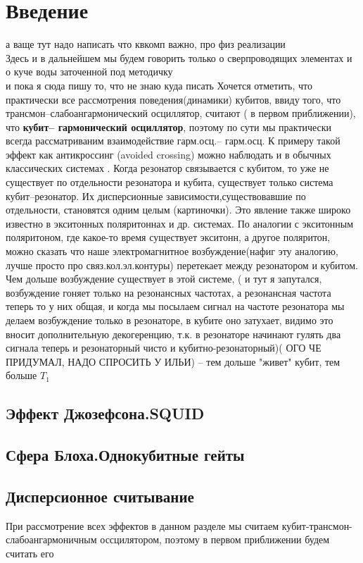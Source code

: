 \documentclass[12pt, twoside]{report}
\begin{document}
\tableofcontents
	\newpage

\chapter{Введение}
а ваще тут надо написать что квкомп важно, про физ реализации\\
 Здесь и в дальнейшем мы будем говорить только о сверпроводящих элементах и о куче воды заточенной под методичку\\ и пока я сюда пишу то, что не знаю куда писать
 Хочется отметить, что практически все рассмотрения поведения(динамики) кубитов, ввиду того, что трансмон--слабоангармонический осциллятор, считают ( в первом приближении), что \textbf{кубит-- гармонический осциллятор}, поэтому по сути мы практически всегда рассматриваним взаимодействие гарм.осц.-- гарм.осц. К примеру такой эффект как антикроссинг (avoided crossing) можно наблюдать и в обычных классических системах \cite{Novotny2010}. Когда резонатор связывается с кубитом, то уже не существует по отдельности резонатора и кубита, существует только система кубит--резонатор. Их дисперсионные зависимости,существовавшие по отдельности, становятся одним целым (картиночки). Это явление также широко известно в экситонных поляритоннах и др. системах. По аналогии с экситонным поляритоном, где какое-то время существует экситонн, а другое поляритон, можно сказать что наше электромагнитное возбуждение(нафиг эту аналогию, лучше просто про связ.кол.эл.контуры) перетекает между резонатором и кубитом. Чем дольше возбуждение существует в этой системе, ( и тут я запутался, возбуждение гоняет только на резонансных частотах, а резонансная частота теперь то у них общая, и когда мы посылаем сигнал на частоте резонатора мы делаем возбуждение только в резонаторе, в кубите оно затухает, видимо это вносит дополнительную декогеренцию, т.к. в резонаторе начинают гулять два сигнала теперь и резонаторный чисто и кубитно-резонаторный)( ОГО ЧЕ ПРИДУМАЛ, НАДО СПРОСИТЬ У ИЛЬИ) -- тем дольше "живет" кубит, тем больше $T_1$
	\section{Эффект Джозефсона.SQUID}
	
	\section{Сфера Блоха.Однокубитные гейты}

	\section{Дисперсионное считывание}
	При рассмотрение всех эффектов в данном разделе мы считаем кубит-трансмон-слабоангармоничным оссцилятором, поэтому в первом приближении будем считать его
\end{document}
